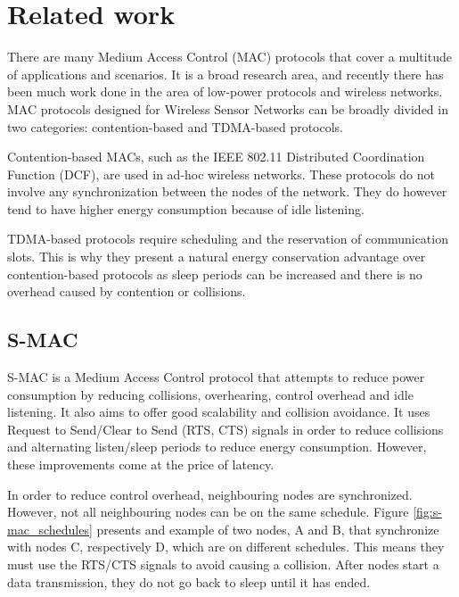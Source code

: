 
\chapter{Related work}

There are many Medium Access Control (MAC) protocols that cover a multitude of
applications and scenarios. It is a broad research area, and recently there
has been much work done in the area of low-power protocols and wireless networks. MAC
protocols designed for Wireless Sensor Networks can be broadly divided in two
categories: contention-based and TDMA-based protocols.

Contention-based MACs, such as the IEEE 802.11 Distributed Coordination
Function\cite{ieee1997wireless} (DCF), are used in ad-hoc wireless networks.
These protocols do not involve any synchronization between the nodes of the
network. They do however tend to have higher energy consumption because of idle
listening.

TDMA-based protocols require scheduling and the reservation of communication
slots. This is why they present a natural energy conservation advantage over
contention-based protocols as sleep periods can be increased and there is no
overhead caused by contention or collisions.

\section{S-MAC}

S-MAC\cite{ye2004medium} is a Medium Access Control protocol that attempts to
reduce power consumption by reducing collisions, overhearing, control overhead
and idle listening. It also aims to offer good scalability and collision
avoidance. It uses Request to Send/Clear to Send (RTS, CTS) signals in order to
reduce collisions and alternating listen/sleep periods to reduce energy
consumption. However, these improvements come at the price of latency. 

In order to reduce control overhead, neighbouring nodes are synchronized.
However, not all neighbouring nodes can be on the same schedule.  Figure
\ref{fig:s-mac_schedules} presents and example of two nodes, A and B, that
synchronize with nodes C, respectively D, which are on different
schedules. This means they must use the RTS/CTS signals to avoid causing a
collision. After nodes start a data transmission, they do not go back to sleep
until it has ended.

